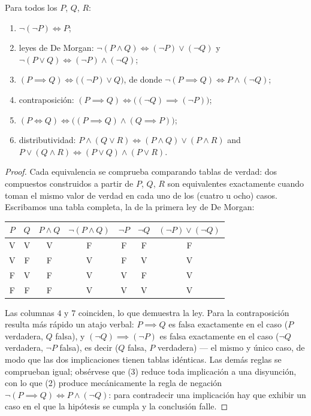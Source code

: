 \begin{proposition}\label{prop:b1:logic:rules}
Para todos los  $P$, $Q$, $R$:
\begin{enumerate}
  \item $\lnot(\lnot P) \iff P$;
  \item leyes de De Morgan:
        $\lnot(P \land Q) \iff (\lnot P) \lor (\lnot Q)$ y
        $\lnot(P \lor Q) \iff (\lnot P) \land (\lnot Q)$;
  \item $(P \implies Q) \iff \bigl((\lnot P) \lor Q\bigr)$, de donde
        $\lnot(P \implies Q) \iff P \land (\lnot Q)$;
  \item contraposición:
        $(P \implies Q) \iff \bigl((\lnot Q) \implies (\lnot P)\bigr)$;
  \item $(P \iff Q) \iff \bigl((P \implies Q) \land (Q \implies
        P)\bigr)$;
  \item distributividad: $P \land (Q \lor R) \iff (P \land Q) \lor
        (P \land R)$ and $P \lor (Q \land R) \iff (P \lor Q) \land
        (P \lor R)$.
\end{enumerate}
\end{proposition}

\begin{proof}
Cada equivalencia se comprueba comparando tablas de verdad: dos
 compuestos construidos a partir de $P$, $Q$, $R$ son
equivalentes exactamente cuando toman el mismo valor de verdad en cada
uno de los (cuatro u ocho) casos. Escribamos una tabla completa, la de
la primera ley de De Morgan:
\begin{center}
\begin{tabular}{cc|c|c|cc|c}
$P$ & $Q$ & $P \land Q$ & $\lnot(P \land Q)$ & $\lnot P$ & $\lnot Q$ &
$(\lnot P) \lor (\lnot Q)$ \\
\hline
V & V & V & F & F & F & F \\
V & F & F & V & F & V & V \\
F & V & F & V & V & F & V \\
F & F & F & V & V & V & V \\
\end{tabular}
\end{center}
Las columnas $4$ y $7$ coinciden, lo que demuestra la ley. Para la
contraposición resulta más rápido un atajo verbal: $P \implies Q$ es
falsa exactamente en el caso ($P$ verdadera, $Q$ falsa), y
$(\lnot Q) \implies (\lnot P)$ es falsa exactamente en el caso
($\lnot Q$ verdadera, $\lnot P$ falsa), es decir ($Q$ falsa, $P$
verdadera) --- el mismo y único caso, de modo que las dos implicaciones
tienen tablas idénticas. Las demás reglas se comprueban igual;
obsérvese que (3) reduce toda implicación a una disyunción, con lo que
(2) produce mecánicamente la regla de negación $\lnot(P \implies Q)
\iff P \land (\lnot Q)$: para contradecir una implicación hay que
exhibir un caso en el que la hipótesis se cumpla y la conclusión falle.
\end{proof}

